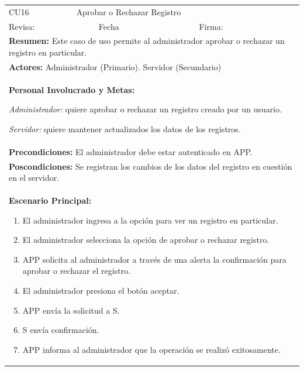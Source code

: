 \begin{longtable}{|l|p{5.5cm}|l|p{2cm}|l|p{1.9cm}|} \hline
    \cellcolor{grisOscuro} CU16 & \multicolumn{4}{|l|}{  \cellcolor{grisOscuro} Aprobar o Rechazar Registro} &  \cellcolor{grisClaro}\multirow{2}{1cm}{} \\ \cline{1-5}
    \cellcolor{grisOscuro} Revisa: &  \cellcolor{grisClaro} &  \cellcolor{grisOscuro} Fecha &  \cellcolor{grisClaro} &  \cellcolor{grisOscuro} Firma: & \cellcolor{grisClaro} \\ \hline
    \multicolumn{6}{|p{15cm}|}{ \textbf{Resumen: } Este caso de uso permite al administrador aprobar o rechazar un registro en particular.

    } \\ \hline

    \multicolumn{6}{|p{15cm}|}{ \textbf{Actores: } Administrador (Primario). Servidor (Secundario)

    } \\ \hline

    \multicolumn{6}{|p{15cm}|}{ \textbf{Personal Involucrado y Metas: }
    
    \emph{Administrador:} quiere aprobar o rechazar un registro creado por un usuario.

    \emph{Servidor:} quiere mantener actualizados los datos de los registros.

    } \\ \hline

    \multicolumn{6}{|p{15cm}|}{ \textbf{Precondiciones: } El administrador debe estar autenticado en APP.

    } \\ \hline

    \multicolumn{6}{|p{15cm}|}{ \textbf{Poscondiciones: } Se registran los cambios de los datos del registro en cuestión en el servidor.

    } \\ \hline

    \multicolumn{6}{|p{15cm}|}{ \textbf{Escenario Principal: }

    \begin{enumerate}
        \item El administrador ingresa a la opción para ver un registro en particular.
        \item El administrador selecciona la opción de aprobar o rechazar registro.
        \item APP solicita al administrador a través de una alerta la confirmación para aprobar o rechazar el registro.
        \item El administrador presiona el botón aceptar.
        \item APP envía la solicitud a S.
        \item S envía confirmación.
        \item APP informa al administrador que la operación se realizó exitosamente.
    \end{enumerate}

}
\end{longtable}
